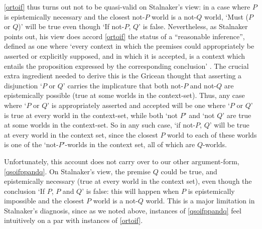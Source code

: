 \documentclass[If.tex]{subfiles}
\begin{document}
\ref{ortoif} thus turns out not to be quasi-valid on Stalnaker's view: in a case where $P$ is epistemically necessary and the closest not-$P$ world is a not-$Q$ world, ‘Must ($P$ or $Q$)’ will be true even though ‘If not-$P$, $Q$’ is false.  Nevertheless, as Stalnaker points out, his view does accord \ref{ortoif} the status of a “reasonable inference”, defined as one where ‘every context in which the premises could appropriately be asserted or explicitly supposed, and in which it is accepted, is a context which entails the proposition expressed by the corresponding conclusion’ \parencite{StalnakerIC}.  The crucial extra ingredient needed to derive this is the Gricean thought that asserting a disjunction ‘$P$ or $Q$’ carries the implicature that both not-$P$ and not-$Q$ are epistemically possible (true at some worlds in the context-set).  Thus, any case where ‘$P$ or $Q$’ is appropriately asserted and accepted will be one where ‘$P$ or $Q$’ is true at every world in the context-set, while both ‘not $P$’ and ‘not $Q$’ are true at some worlds in the context-set.  So in any such case, ‘if not-$P$, $Q$’ will be true at every world in the context set, since the closest $P$ world to each of these worlds is one of the ‘not-$P$’-worlds in the context set, all of which are $Q$-worlds.  

Unfortunately, this account does not carry over to our other argument-form, \ref{qsoifppandq}.  On Stalnaker's view, the premise $Q$ could be true, and epistemically necessary (true at every world in the context set), even though the conclusion ‘If $P$, $P$ and $Q$’ is false: this will happen when $P$ is epistemically impossible and the closest $P$ world is a not-$Q$ world.  This is a major limitation in Stalnaker's diagnosis, since as we noted above, instances of \ref{qsoifppandq} feel intuitively on a par with instances of \ref{ortoif}.  
\end{document}
